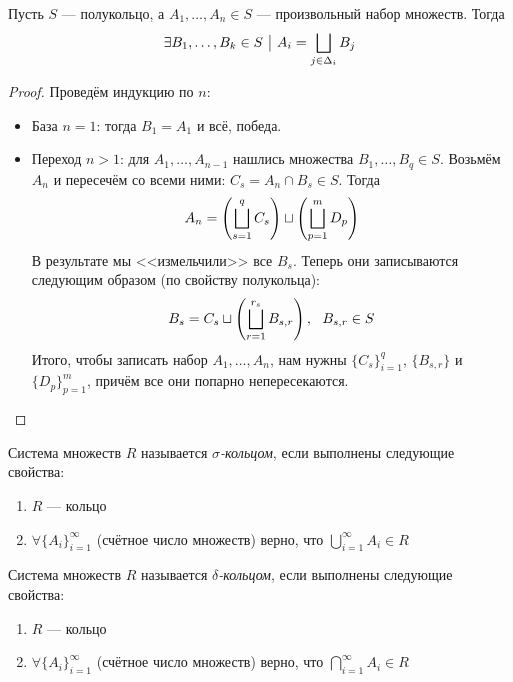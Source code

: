 \begin{lemma}
	Пусть $S$ --- полукольцо, а $A_1, \ldots, A_n \in S$ --- произвольный набор множеств. Тогда
	\[
		\exists B_1, \ldots, B_k \in S \ \big|\  A_i = \bigsqcup_{j \in \Delta_i} B_j
	\]
\end{lemma}

\begin{proof}
	Проведём индукцию по $n$:
	\begin{itemize}
		\item База $n = 1$: тогда $B_1 = A_1$ и всё, победа.
		
		\item Переход $n > 1$: для $A_1, \ldots, A_{n - 1}$ нашлись множества $B_1, \ldots, B_q \in S$. Возьмём $A_n$ и пересечём со всеми ними: $C_s = A_n \cap B_s \in S$. Тогда
		\[
			A_n = \left(\bigsqcup_{s = 1}^q C_s\right) \sqcup \left(\bigsqcup_{p = 1}^m D_p\right)
		\]
		В результате мы <<измельчили>> все $B_s$. Теперь они записываются следующим образом (по свойству полукольца):
		\[
			B_s = C_s \sqcup \left(\bigsqcup_{r = 1}^{r_s} B_{s, r}\right),\ \ B_{s, r} \in S
		\]
		Итого, чтобы записать набор $A_1, \ldots, A_n$, нам нужны $\{C_s\}_{i = 1}^q$, $\{B_{s, r}\}$ и $\{D_p\}_{p = 1}^m$, причём все они попарно непересекаются.
	\end{itemize}
\end{proof}

\begin{definition}
	Система множеств $R$ называется \textit{$\sigma$-кольцом}, если выполнены следующие свойства:
	\begin{enumerate}
		\item $R$ --- кольцо
		
		\item $\forall \{A_i\}_{i = 1}^\infty$ (счётное число множеств) верно, что $\bigcup_{i = 1}^\infty A_i \in R$
	\end{enumerate}
\end{definition}

\begin{definition}
	Система множеств $R$ называется \textit{$\delta$-кольцом}, если выполнены следующие свойства:
	\begin{enumerate}
		\item $R$ --- кольцо
		
		\item $\forall \{A_i\}_{i = 1}^\infty$ (счётное число множеств) верно, что $\bigcap_{i = 1}^\infty A_i \in R$
	\end{enumerate}
\end{definition}

